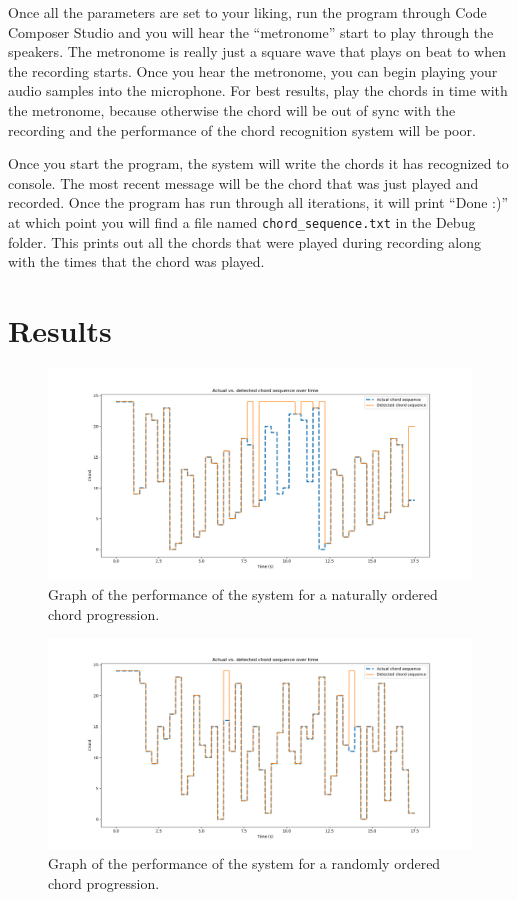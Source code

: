 \documentclass[journal]{IEEEtran}
\begin{document}
Once all the parameters are set to your liking, run the program through Code Composer Studio and you will hear the “metronome” start to play through the speakers.
The metronome is really just a square wave that plays on beat to when the recording starts.
Once you hear the metronome, you can begin playing your audio samples into the microphone.
For best results, play the chords in time with the metronome, because otherwise the chord will be out of sync with the recording and the performance of the chord recognition system will be poor.

Once you start the program, the system will write the chords it has recognized to console.
The most recent message will be the chord that was just played and recorded.
Once the program has run through all iterations, it will print ``Done :)'' at which point you will find a file named \texttt{chord\_sequence.txt} in the Debug folder.
This prints out all the chords that were played during recording along with the times that the chord was played.


\section{Results}

\begin{figure}[!t]
    \centering
    \includegraphics[width = \linewidth]{../Figures/chord_sequence_in_order}
    \caption{Graph of the performance of the system for a naturally ordered chord progression.}
    \label{fig:in_order}
\end{figure}
\begin{figure}[!t]
    \centering
    \includegraphics[width = \linewidth]{../Figures/chord_sequence_random}
    \caption{Graph of the performance of the system for a randomly ordered chord progression.}
    \label{fig:random}
\end{figure}
\end{document}
